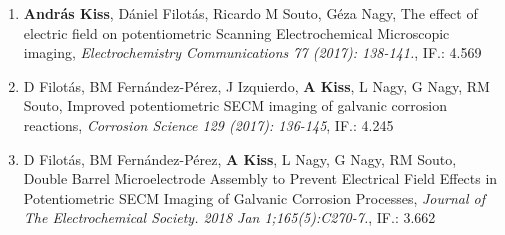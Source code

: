 \documentclass[11pt,a4paper,roman]{article}
\begin{document}
\begin{enumerate}
\item \textbf{András Kiss}, Dániel Filotás, Ricardo M Souto, Géza Nagy, The effect of electric field on potentiometric Scanning Electrochemical Microscopic imaging, \emph{Electrochemistry Communications 77 (2017): 138-141.}, IF.: 4.569

\item D Filotás, BM Fernández-Pérez, J Izquierdo, \textbf{A Kiss}, L Nagy, G Nagy, RM Souto, Improved potentiometric SECM imaging of galvanic corrosion reactions, \emph{Corrosion Science 129 (2017): 136-145}, IF.: 4.245

\item D Filotás, BM Fernández-Pérez, \textbf{A Kiss}, L Nagy, G Nagy, RM Souto, Double Barrel Microelectrode Assembly to Prevent Electrical Field Effects in Potentiometric SECM Imaging of Galvanic Corrosion Processes, \emph{Journal of The Electrochemical Society. 2018 Jan 1;165(5):C270-7.}, IF.: 3.662

\end{enumerate}
\end{document}
